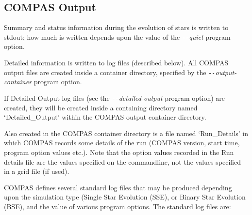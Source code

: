 \newpage
\subsection{COMPAS Output}\label{sec:COMPASOutput}

Summary and status information during the evolution of stars is written to stdout; how much is written depends upon the value of the \textit{\texttt{-{}-}quiet} program option.  

Detailed information is written to log files (described below).  All COMPAS output files are created inside a container directory, specified by the \textit{\texttt{-{}-}output-container} program option.

If Detailed Output log files (see the \textit{\texttt{-{}-}detailed-output} program option) are created, they will be created inside a containing directory named `Detailed\_Output' within the COMPAS output container directory.

Also created in the COMPAS container directory is a file named `Run\_Details' in which COMPAS records some details of the run (COMPAS version, start time, program option values etc.). Note that the option values recorded in the Run details file are the values specified on the commandline, not the values specified in a grid file (if used).

COMPAS defines several standard log files that may be produced depending upon the simulation type (Single Star Evolution (SSE), or Binary Star Evolution (BSE), and the value of various program options. The standard log files are:

